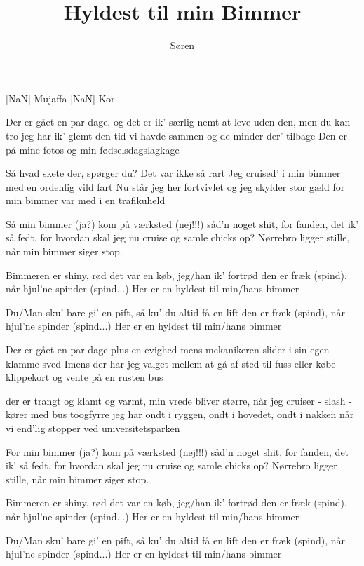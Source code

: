\documentclass[a4paper,11pt]{article}
\title{Hyldest til min Bimmer}
\author{Søren}
\begin{document}
\maketitle

\begin{roles}
[NaN] Mujaffa
[NaN] Kor
\end{roles}

\begin{song}
 Der er gået en par dage, og det er ik' særlig nemt
at leve uden den, men du kan tro jeg har ik' glemt
den tid vi havde sammen og de minder der' tilbage
Den er på mine fotos og min fødselsdagslagkage

 Så hvad skete der, spørger du? Det var ikke så rart
Jeg cruised' i min bimmer med en ordenlig vild fart
Nu står jeg her fortvivlet og jeg skylder stor gæld
for min bimmer var med i en trafikuheld

 Så min bimmer (ja?)
kom på værksted (nej!!!)
såd'n noget shit, for fanden, det ik' så fedt,
for hvordan skal jeg nu cruise og samle chicks op?
Nørrebro ligger stille, når min bimmer siger stop.

 Bimmeren er shiny, rød
det var en køb, jeg/han ik' fortrød
den er fræk (spind), når hjul'ne spinder (spind...)
Her er en hyldest til min/hans bimmer

 Du/Man sku' bare gi' en pift,
så ku' du altid få en lift
den er fræk (spind), når hjul'ne spinder (spind...)
Her er en hyldest til min/hans bimmer

 Der er gået en par dage plus en evighed
mens mekanikeren slider i sin egen klamme sved
Imens der har jeg valget mellem at gå af sted til fuss
eller købe klippekort og vente på en rusten bus

 der er trangt og klamt og varmt, min vrede bliver større,
når jeg cruiser - slash - kører med bus toogfyrre
jeg har ondt i ryggen, ondt i hovedet, ondt i nakken
når vi end'lig stopper ved universitetsparken

 For min bimmer (ja?)
kom på værksted (nej!!!)
såd'n noget shit, for fanden, det ik' så fedt,
for hvordan skal jeg nu cruise og samle chicks op?
Nørrebro ligger stille, når min bimmer siger stop.

 Bimmeren er shiny, rød
det var en køb, jeg/han ik' fortrød
den er fræk (spind), når hjul'ne spinder (spind...)
Her er en hyldest til min/hans bimmer

 Du/Man sku' bare gi' en pift,
så ku' du altid få en lift
den er fræk (spind), når hjul'ne spinder (spind...)
Her er en hyldest til min/hans bimmer


\end{song}
\end{document}
